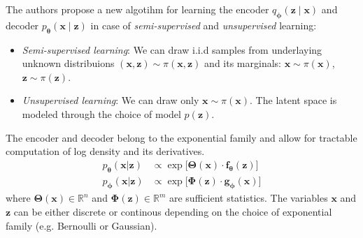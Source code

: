 The authors propose a new algotihm for learning the encoder $q_{\boldsymbol{\phi}}(\boldsymbol{z} \mid \boldsymbol{x})$ and 
decoder $p_{\boldsymbol{\theta}}(\boldsymbol{x} \mid \boldsymbol{z})$ in case of \textit{semi-supervised} and 
\textit{unsupervised} learning:
\begin{itemize}
    \item \textit{Semi-supervised learning}: We can draw i.i.d samples from underlaying unknown distribuions $(\boldsymbol{x},\boldsymbol{z})  \sim \pi(\boldsymbol{x},\boldsymbol{z})$
    and its marginals: $\boldsymbol{x} \sim \pi(\boldsymbol{x})$, $\boldsymbol{z} \sim \pi(\boldsymbol{z})$.
    \item \textit{Unsupervised learning}: We can draw only $\boldsymbol{x} \sim \pi(\boldsymbol{x})$. The latent space is modeled
    through the choice of model $p(\boldsymbol{z})$.
\end{itemize}

The encoder and decoder belong to the exponential family and allow for tractable computation of log density and its derivatives.
\begin{align*}
    p_{\boldsymbol{\theta}}(\boldsymbol{x} | \boldsymbol{z}) &\propto \exp \bigl[ \boldsymbol{\Theta}(\boldsymbol{x}) \cdot \boldsymbol{f}_{\boldsymbol{\theta}}(\boldsymbol{z}) \bigr] \\
    p_{\boldsymbol{\phi}}(\boldsymbol{x} | \boldsymbol{z}) &\propto \exp \bigl[ \boldsymbol{\Phi}(\boldsymbol{z}) \cdot \boldsymbol{g}_{\boldsymbol{\phi}}(\boldsymbol{x}) \bigr]
\end{align*} 
where $\boldsymbol{\Theta}(\boldsymbol{x}) \in \mathbb{R}^n$ and $ \boldsymbol{\Phi}(\boldsymbol{z}) \in \mathbb{R}^m$ are sufficient
statistics. The variables $\boldsymbol{x}$ and $\boldsymbol{z}$ can be either discrete or continous depending on the choice of exponential family (e.g. Bernoulli or Gaussian). 

